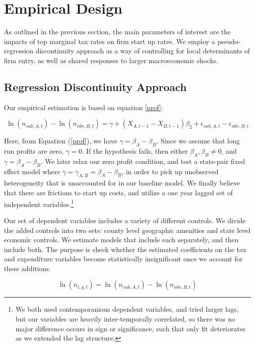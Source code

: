 \section{Empirical Design}

As outlined in the previous section, the main parameters of interest are the impacts of top marginal tax rates on firm start up rates. We employ a pseudo-regression discontinuity approach as a way of controlling for local determinants of firm entry, as well as shared responses to larger macroeconomic shocks.

\subsection{Regression Discontinuity Approach}

Our empirical estimation is based on equation \ref{prof}:

\begin{equation}\label{pref}
\ln(n_{sub,A,t})-\ln(n_{nbr,B,t}) = \gamma+ (X_{A,t-1}-X_{B,t-1})\beta_{2} + \epsilon_{sub,A,t}-\epsilon_{nbr,B,t}
\end{equation}

Here, from Equation (\ref{prof}), we have $\gamma = \beta_{A} - \beta_{B}$. Since we assume that long run profits are zero, $\gamma = 0$. If the hypothesis fails, then either $\beta_{A}, \beta_{B} \neq  0$, and $\gamma = \beta_{A} - \beta_{B}$. We later relax our zero profit condition, and test a state-pair fixed effect model where $\gamma = \gamma_{A,B} = \beta_{A} - \beta_{B}$, in order to pick up unobserved heterogeneity that is unaccounted for in our baseline model. We finally believe that there are frictions to start up costs, and utilize a one year lagged set of independent variables.\footnote{We both used contemporanious dependent variables, and tried larger lags, but our variables are heavily inter-temporally correlated, so there was no major difference occurs in sign or significance, such that only fit deteriorates as we extended the lag structure.}

Our set of dependent variables includes a variety of different controls. We divide the added  controls into two sets: county level geographic amenities and state level economic controls. We estimate models that include each separately, and then include both. The purpose is check whether the estimated coefficients on the tax and expenditure variables become statistically insignificant once we account for these additions.

\begin{equation}
\ddot \ln(n_{i,g,t}) = \ln(n_{sub,A,t})-\ln(n_{nbr,B,t})
\end{equation}

